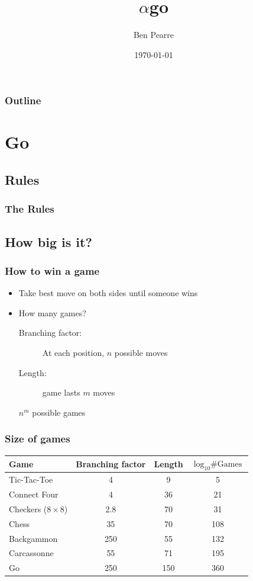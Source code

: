 \documentclass{beamer}
\title[$\alpha$go]{$\alpha$go}
\author{Ben Pearre}
\date{\today}
\begin{document}
\begin{frame}
  \titlepage
\end{frame}

\begin{frame}
  \frametitle{Outline}
  \tableofcontents
\end{frame}




\section{Go}

\subsection{Rules}

\begin{frame}
  \frametitle{The Rules}
  \href{http://playgo.to/index-e.html}{}
\end{frame}

\subsection{How big is it?}

\begin{frame}
  \frametitle{How to win a game}
  \begin{itemize}
  \item Take best move on both sides until someone wins
  \item How many games?
    \begin{description}
    \item[Branching factor:] At each position, $n$ possible moves
    \item[Length:] game lasts $m$ moves
    \end{description}
    $n^m$ possible games
  \end{itemize}
\end{frame}


\begin{frame}
  \frametitle{Size of games}
  \begin{tabular}{l|ccc}
    Game & Branching factor & Length & $\log_{10}\mbox{\# Games}$\\ \hline
    Tic-Tac-Toe & 4 & 9 & 5 \\
    Connect Four & 4 & 36 & 21 \\
    Checkers ($8\times 8$) & 2.8 & 70 & 31 \\
    Chess & 35 & 70 & 108 \\
    Backgammon & 250 & 55 & 132 \\
    Carcassonne & 55 & 71 & 195 \\
    Go & 250 & 150 & 360
  \end{tabular}
\end{frame}
\end{document}
